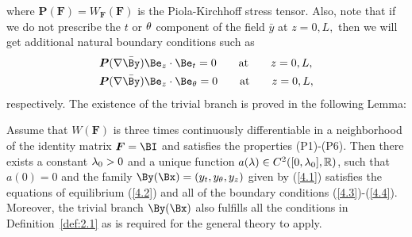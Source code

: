 where $\boldsymbol{P}(\boldsymbol{F})=W_{\boldsymbol{F}}(\boldsymbol{F})$  is the Piola-Kirchhoff stress tensor. Also, note that if we do not prescribe the $t$ or $\theta$ component of the field $\bar y$ at $z=0,L,$ then we will get additional natural boundary conditions such as 
\begin{align}
\label{4.4}
&\bm P (\nabla\bar\By)\Be_z\cdot \Be_t=0    \qquad\text{at}\qquad z=0,L,\\ \nonumber
&\bm P (\nabla\bar\By)\Be_z\cdot \Be_\Gth=0    \qquad\text{at}\qquad z=0,L,
\end{align}
respectively. The existence of the trivial branch is proved in the following Lemma:

\begin{lemma}
\label{lem:4.1}
Assume that $W(\bm F)$ is three times continuously differentiable in a neighborhood of the identity matrix $\bm F=\BI$ and satisfies the properties (P1)-(P6). Then there exists a constant $\lambda_0>0$ and a unique function $a(\lambda)\in C^2([0,\lambda_0],\mathbb R)$, such that $a(0)=0$ and the family $\By(\Bx)=(y_t,y_\Gth,y_z)$ 
given by (\ref{4.1}) satisfies the equations of equilibrium (\ref{4.2}) and all of the boundary conditions (\ref{4.3})-(\ref{4.4}). Moreover, the trivial branch $\By(\Bx)$ also fulfills all the conditions in Definition~\ref{def:2.1} as is required for the general theory to apply. 

\end{lemma}


